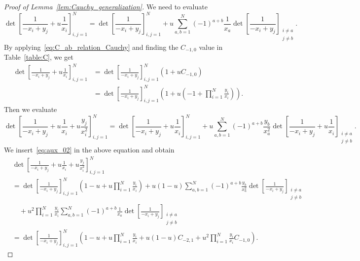 \documentclass[10pt,a4paper]{amsart}
\begin{document}
\begin{proof}[Proof of Lemma~\ref{lem:Cauchy_generalization}]
We need to evaluate
\begin{equation*}
	\det\left[\frac{1}{-x_i+y_j} +u\frac{1}{x_i}\right]_{i,j=1}^N =\det\left[\frac{1}{-x_i+y_j}\right]_{i,j=1}^N + u\sum_{a,b=1}^N (-1)^{a+b}\frac{1}{x_a} \det\left[\frac{1}{-x_i+y_j}\right]_{\substack{i\ne a\\ j\ne b}}.
\end{equation*}
By applying~\eqref{eq:C_ab_relation_Cauchy} and finding the $C_{-1,0}$ value in Table~\ref{table:C}, we get
\begin{equation}
	\label{eq:aux_02}
	\begin{split}
	\det\left[\frac{1}{-x_i+y_j} +u\frac{1}{x_i}\right]_{i,j=1}^N 
	&=\det\left[\frac{1}{-x_i+y_j}\right]_{i,j=1}^N \left(1+uC_{-1,0}\right)\\
	&=\det\left[\frac{1}{-x_i+y_j}\right]_{i,j=1}^N  \left(1+ u\left(-1+\prod_{i=1}^N\frac{y_i}{x_i}\right)\right).
	\end{split}
\end{equation}
Then we evaluate
\begin{equation*}
	\det\left[  \frac{1}{-x_i+y_j} +u \frac{1}{x_i} +u \frac{y_j}{x_i^2} \right]_{i,j=1}^N = \det\left[\frac{1}{-x_i+y_j} +u\frac{1}{x_i}\right]_{i,j=1}^N
	+u\sum_{a,b=1}^N (-1)^{a+b}\frac{y_b}{x_a^2}\det\left[\frac{1}{-x_i+y_j} +u\frac{1}{x_i}\right]_{\substack{i\ne a\\ j\ne b}}.
\end{equation*}
We insert~\eqref{eq:aux_02} in the above equation and obtain
\begin{equation}
	\label{eq:aux_03}
	\begin{split}
		&\det\left[  \frac{1}{-x_i+y_j} +u \frac{1}{x_i} +u \frac{y_j}{x_i^2} \right]_{i,j=1}^N\\
		&= \det\left[\frac{1}{-x_i+y_j}\right]_{i,j=1}^N  \left(1- u+ u\prod_{i=1}^N\frac{y_i}{x_i}\right)
		+u(1-u)\sum_{a,b=1}^N (-1)^{a+b}\frac{y_b}{x_a^2}\det\left[\frac{1}{-x_i+y_j}\right]_{\substack{i\ne a\\ j\ne b}}\\
		&\quad +u^2\prod_{i=1}^N\frac{y_i}{x_i}\sum_{a,b=1}^N (-1)^{a+b}\frac{1}{x_a}\det\left[\frac{1}{-x_i+y_j}\right]_{\substack{i\ne a\\ j\ne b}}\\
		&=\det\left[\frac{1}{-x_i+y_j}\right]_{i,j=1}^N  \left(1- u+ u\prod_{i=1}^N\frac{y_i}{x_i}
		+u(1-u) C_{-2,1} + u^2\prod_{i=1}^N\frac{y_i}{x_i} C_{-1,0}\right).
	\end{split}
\end{equation}

\end{proof}
\end{document}
